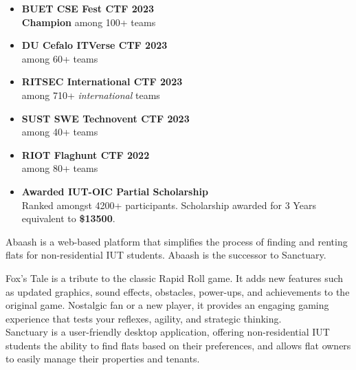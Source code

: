 \documentclass[10pt,a4paper,ragged2e,withhyper]{altacv}
\begin{document}
\begin{paracol}{2}
            \begin{itemize}[label = \color{accent}\faTrophy] 
                \item {\color{BodyColor}\textbf{BUET CSE Fest CTF 2023}}\\
                \textbf{Champion} among 100+ teams
                \vspace{0.5em}
                \item {\color{BodyColor}\textbf{DU Cefalo ITVerse CTF 2023 }}\\
                \textbf{\small {}} among 60+ teams
                \vspace{0.5em}
                \item {\color{BodyColor}\textbf{RITSEC International CTF 2023}}\\\textbf{\small {}}  among 710+ \textit{international} teams
                \vspace{0.5em}
                \item {\color{BodyColor}\textbf{SUST SWE Technovent  CTF 2023}}\\\textbf{\small {}} among 40+ teams
                \vspace{0.5em}
                \item {\color{BodyColor}\textbf{RIOT Flaghunt CTF 2022}}\\\small \textbf{} among 80+ teams
                \vspace{.05em}
                \item {\color{BodyColor}\textbf{Awarded IUT-OIC Partial Scholarship}}\\\small Ranked  amongst 4200+ participants. Scholarship awarded for 3 Years equivalent to \textbf{\$13500}.
            \end{itemize}
        
        
             Abaash is a web-based platform that simplifies the process of finding and renting flats for non-residential IUT students. Abaash is the successor to Sanctuary.
            
            Fox's Tale is a tribute to the classic Rapid Roll game. It adds new features such as updated graphics, sound effects, obstacles, power-ups, and achievements to the original game. Nostalgic fan or a new player, it provides an engaging gaming experience that tests your reflexes, agility, and strategic thinking.
\\
             Sanctuary is a user-friendly desktop application, offering non-residential IUT students the ability to find flats based on their preferences, and allows flat owners to easily manage their properties and tenants.


\end{paracol}
\end{document}
